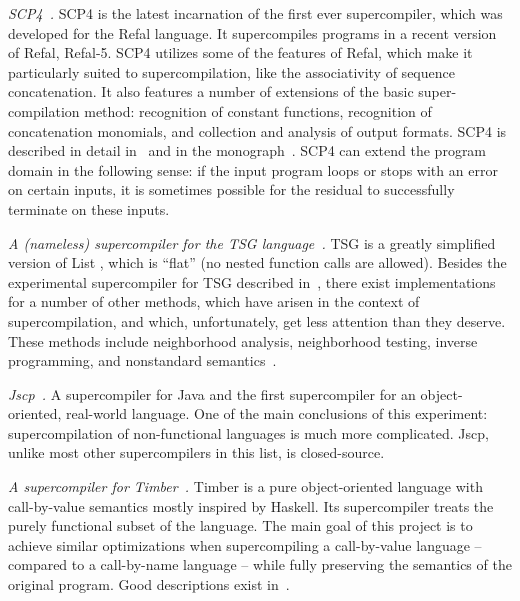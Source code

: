 \begin{longitem}

\item \emph{SCP4~\cite{Scp4Url}.} SCP4 
is the latest incarnation of the first ever supercompiler, which was
developed for the Refal language. 
It supercompiles programs in a recent version of Refal, Refal-5.
SCP4 utilizes some of the features of Refal, which make it particularly
suited to supercompilation, like the associativity of sequence concatenation.
It also features a number of extensions of the basic super-compilation method:
recognition of constant functions,
recognition of concatenation monomials, and
collection and analysis of output formats.
SCP4 is described in detail in~\cite{Nemytykh2008PhD} and in the monograph~\cite{Nemytykh2007SCP4}.
SCP4 can extend the program domain in the following sense:
if the input program loops or stops with an error on certain inputs,
it is sometimes possible for the residual to successfully terminate on these inputs.

\item \emph{A (nameless) supercompiler for the  TSG language~\cite{TsgUrl}.} TSG 
    is a greatly simplified version of List , which is ``flat'' (no nested function calls are allowed).
Besides the experimental supercompiler for TSG described in~\cite{Abramov2006meta2},
there exist implementations for a number of other methods, which have arisen 
in the context of supercompilation, and which, unfortunately, get less attention
than they deserve.
These methods include neighborhood analysis, neighborhood testing, inverse programming, and
nonstandard semantics~\cite{Abramov1995meta}.

\item \emph{Jscp\cite{Klimov2008Jscp}~\cite{JscpUrl}.} A supercompiler for Java and
the first supercompiler for an object-oriented, real-world language.
One of the main conclusions of this experiment: supercompilation of
non-functional languages is much more complicated.
Jscp, unlike most other supercompilers in this list, is closed-source.

\item \emph{A supercompiler for Timber~\cite{TimberUrl}.} Timber 
is a pure object-oriented language with call-by-value semantics mostly inspired by Haskell.
Its supercompiler treats the purely functional subset of the language.
The main goal of this project is to achieve similar optimizations 
when supercompiling a call-by-value language -- compared to a call-by-name language --
while fully preserving the semantics of the original program.
Good descriptions exist in~\cite{Jonsson2008Supercompilation,Jonsson2011Phd}.


\end{longitem}
